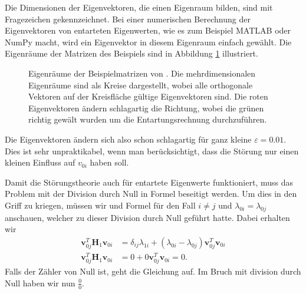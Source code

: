 Die Dimensionen der Eigenvektoren, die einen Eigenraum bilden, sind mit Fragezeichen gekennzeichnet.
Bei einer numerischen Berechnung der Eigenvektoren von entarteten Eigenwerten, wie es zum Beispiel MATLAB oder NumPy macht, wird ein Eigenvektor in diesem Eigenraum einfach gewählt.
Die Eigenräume der Matrizen des Beispiels sind in Abbildung \ref{ew:fig:entartung} illustriert.
\begin{figure}
    \begin{center}
        
    \end{center}
    \caption{
        Eigenräume der Beispielmatrizen von .
        Die mehrdimensionalen Eigenräume sind als Kreise dargestellt, wobei alle orthogonale Vektoren auf der Kreisfläche gültige Eigenvektoren sind.
        Die roten Eigenvektoren ändern schlagartig die Richtung, wobei die grünen richtig gewält wurden um die Entartungsrechnung durchzuführen.
        }
    \label{ew:fig:entartung}
\end{figure}
Die Eigenvektoren ändern sich also schon schlagartig für ganz kleine $\varepsilon = 0.01$.
Dies ist sehr unpraktikabel, wenn man berücksichtigt, dass die Störung nur einen kleinen Einfluss auf $v_{0i}$ haben soll.

Damit die Störungstheorie auch für entartete Eigenwerte funktioniert, muss das Problem mit der Division durch Null in Formel  beseitigt werden.
Um dies in den Griff zu kriegen, müssen wir und Formel  für den Fall $i \neq j$ und $\lambda_{0i} = \lambda_{0j}$ anschauen, welcher zu dieser Division durch Null geführt hatte.
Dabei erhalten wir
\begin{align}
    \bm v_{0j}^T \bm H_1 \bm v_{0i}
    &=
    \delta_{ij} \lambda_{1i} +
    ( \lambda_{0i} - \lambda_{0j} )
    \bm v_{0j}^T  \bm v_{0i} \nonumber
    \\
    \bm v_{0j}^T \bm H_1 \bm v_{0i}
    &=
    0 +
    0
    \bm v_{0j}^T  \bm v_{0i}
    = 0.
\end{align}
Falls der Zähler von  Null ist, geht die Gleichung auf.
Im Bruch mit division durch Null haben wir nun $\frac{0}{0}$.

